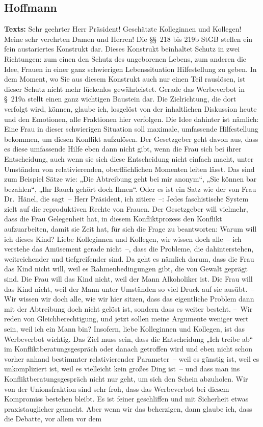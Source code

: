 \documentclass{article}
\begin{document}
\subsection{Hoffmann}
\noindent\textbf{Texts:} Sehr geehrter Herr Präsident! Geschätzte Kolleginnen und Kollegen! Meine sehr verehrten Damen und Herren! Die §§ 218 bis 219b StGB stellen ein fein austariertes Konstrukt dar. Dieses Konstrukt beinhaltet Schutz in zwei Richtungen: zum einen den Schutz des ungeborenen Lebens, zum anderen die Idee, Frauen in einer ganz schwierigen Lebenssituation Hilfestellung zu geben. In dem Moment, wo Sie aus diesem Konstrukt auch nur einen Teil rauslösen, ist dieser Schutz nicht mehr lückenlos gewährleistet.  Gerade das Werbeverbot in § 219a stellt einen ganz wichtigen Baustein dar. Die Zielrichtung, die dort verfolgt wird, können, glaube ich, losgelöst von der inhaltlichen Diskussion heute und den Emotionen, alle Fraktionen hier verfolgen. Die Idee dahinter ist nämlich: Eine Frau in dieser schwierigen Situation soll maximale, umfassende Hilfestellung bekommen, um diesen Konflikt aufzulösen. Der Gesetzgeber geht davon aus, dass es diese umfassende Hilfe eben dann nicht gibt, wenn die Frau sich bei ihrer Entscheidung, auch wenn sie sich diese Entscheidung nicht einfach macht, unter Umständen von relativierenden, oberflächlichen Momenten leiten lässt. Das sind zum Beispiel Sätze wie: „Die Abtreibung geht bei mir anonym“, „Sie können bar bezahlen“, „Ihr Bauch gehört doch Ihnen“.  Oder es ist ein Satz wie der von Frau Dr. Hänel, die sagt – Herr Präsident, ich zitiere –: Jedes faschistische System zielt auf die reproduktiven Rechte von Frauen.  Der Gesetzgeber will vielmehr, dass die Frau Gelegenheit hat, in diesem Konfliktprozess  den Konflikt aufzuarbeiten, damit sie Zeit hat, für sich die Frage zu beantworten: Warum will ich dieses Kind?  Liebe Kolleginnen und Kollegen, wir wissen doch alle – ich verstehe das Amüsement gerade nicht –,  dass die Probleme, die dahinterstehen, weitreichender und tiefgreifender sind. Da geht es nämlich darum, dass die Frau das Kind nicht will, weil es Rahmenbedingungen gibt, die von Gewalt geprägt sind. Die Frau will das Kind nicht, weil der Mann Alkoholiker ist. Die Frau will das Kind nicht, weil der Mann unter Umständen so viel Druck auf sie ausübt. – Wir wissen wir doch alle, wie wir hier sitzen, dass das eigentliche Problem dann mit der Abtreibung doch nicht gelöst ist, sondern dass es weiter besteht.  – Wir reden von Gleichberechtigung, und jetzt sollen meine Argumente weniger wert sein, weil ich ein Mann bin?  Insofern, liebe Kolleginnen und Kollegen, ist das Werbeverbot wichtig. Das Ziel muss sein, dass die Entscheidung „Ich treibe ab“ im Konfliktberatungsgespräch oder danach getroffen wird und eben nicht schon vorher anhand bestimmter relativierender Parameter – weil es günstig ist, weil es unkompliziert ist, weil es vielleicht kein großes Ding ist – und dass man ins Konfliktberatungsgespräch nicht nur geht, um sich den Schein abzuholen.  Wir von der Unionsfraktion sind sehr froh, dass das Werbeverbot bei diesem Kompromiss bestehen bleibt.  Es ist feiner geschliffen und mit Sicherheit etwas praxistauglicher gemacht. Aber wenn wir das beherzigen, dann glaube ich, dass die Debatte, vor allem vor dem 
\end{document}
